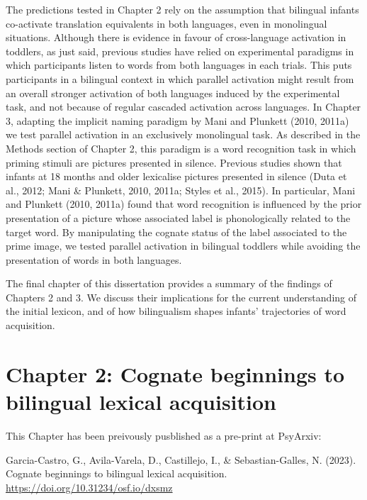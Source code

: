 \documentclass[
  12pt,
  b5paperpaper,
  twoside]{scrreprt}
\begin{document}
The predictions tested in Chapter 2 rely on the assumption that
bilingual infants co-activate translation equivalents in both languages,
even in monolingual situations. Although there is evidence in favour of
cross-language activation in toddlers, as just said, previous studies
have relied on experimental paradigms in which participants listen to
words from both languages in each trials. This puts participants in a
bilingual context in which parallel activation might result from an
overall stronger activation of both languages induced by the
experimental task, and not because of regular cascaded activation across
languages. In Chapter 3, adapting the implicit naming paradigm by Mani
and Plunkett (2010, 2011a) we test parallel activation in an exclusively
monolingual task. As described in the Methods section of Chapter 2, this
paradigm is a word recognition task in which priming stimuli are
pictures presented in silence. Previous studies shown that infants at 18
months and older lexicalise pictures presented in silence (Duta et al.,
2012; Mani \& Plunkett, 2010, 2011a; Styles et al., 2015). In
particular, Mani and Plunkett (2010, 2011a) found that word recognition
is influenced by the prior presentation of a picture whose associated
label is phonologically related to the target word. By manipulating the
cognate status of the label associated to the prime image, we tested
parallel activation in bilingual toddlers while avoiding the
presentation of words in both languages.

The final chapter of this dissertation provides a summary of the
findings of Chapters 2 and 3. We discuss their implications for the
current understanding of the initial lexicon, and of how bilingualism
shapes infants' trajectories of word acquisition.


\hypertarget{chapter-2-cognate-beginnings-to-bilingual-lexical-acquisition}{%
\chapter{Chapter 2: Cognate beginnings to bilingual lexical
acquisition}\label{chapter-2-cognate-beginnings-to-bilingual-lexical-acquisition}}

\begin{tcolorbox}[enhanced jigsaw, opacityback=0, colframe=quarto-callout-note-color-frame, breakable, titlerule=0mm, toptitle=1mm, bottomrule=.15mm, colbacktitle=quarto-callout-note-color!10!white, arc=.35mm, rightrule=.15mm, coltitle=black, bottomtitle=1mm, toprule=.15mm, title=\textcolor{quarto-callout-note-color}{\faInfo}\hspace{0.5em}{Note}, opacitybacktitle=0.6, leftrule=.75mm, left=2mm, colback=white]

This Chapter has been preivously pusblished as a pre-print at PsyArxiv:

Garcia-Castro, G., Avila-Varela, D., Castillejo, I., \&
Sebastian-Galles, N. (2023). Cognate beginnings to bilingual lexical
acquisition. \url{https://doi.org/10.31234/osf.io/dxsmz}

\end{tcolorbox}
\end{document}

